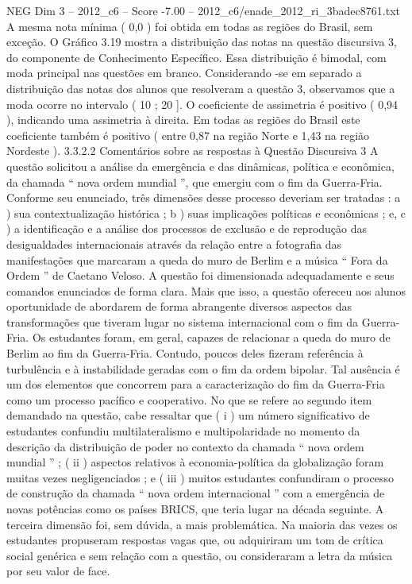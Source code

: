 \begin{textsample}{NEG Dim 3 – 2012\_c6 – Score -7.00 – 2012\_c6/enade\_2012\_ri\_3badec8761.txt}
A mesma nota mínima ( 0,0 ) foi obtida em todas as regiões do Brasil, sem exceção.
O Gráfico 3.19 mostra a distribuição das notas na questão discursiva 3, do componente de Conhecimento Específico.
Essa distribuição é bimodal, com moda principal nas questões em branco.
Considerando -se em separado a distribuição das notas dos alunos que resolveram a questão 3, observamos que a moda ocorre no intervalo ( 10 ; 20 ].
O coeficiente de assimetria é positivo ( 0,94 ), indicando uma assimetria à direita.
Em todas as regiões do Brasil este coeficiente também é positivo ( entre 0,87 na região Norte e 1,43 na região Nordeste ). 3.3.2.2 Comentários sobre as respostas à Questão Discursiva 3 A questão solicitou a análise da emergência e das dinâmicas, política e econômica, da chamada “ nova ordem mundial ”, que emergiu com o fim da Guerra-Fria.
Conforme seu enunciado, três dimensões desse processo deveriam ser tratadas : a ) sua contextualização histórica ; b ) suas implicações políticas e econômicas ; e, c ) a identificação e a análise dos processos de exclusão e de reprodução das desigualdades internacionais através da relação entre a fotografia das manifestações que marcaram a queda do muro de Berlim e a música “ Fora da Ordem ” de Caetano Veloso.
A questão foi dimensionada adequadamente e seus comandos enunciados de forma clara.
Mais que isso, a questão ofereceu aos alunos oportunidade de abordarem de forma abrangente diversos aspectos das transformações que tiveram lugar no sistema internacional com o fim da Guerra-Fria.
Os estudantes foram, em geral, capazes de relacionar a queda do muro de Berlim ao fim da Guerra-Fria.
Contudo, poucos deles fizeram referência à turbulência e à instabilidade geradas com o fim da ordem bipolar.
Tal ausência é um dos elementos que concorrem para a caracterização do fim da Guerra-Fria como um processo pacífico e cooperativo.
No que se refere ao segundo item demandado na questão, cabe ressaltar que ( i ) um número significativo de estudantes confundiu multilateralismo e multipolaridade no momento da descrição da distribuição de poder no contexto da chamada “ nova ordem mundial ” ; ( ii ) aspectos relativos à economia-política da globalização foram muitas vezes negligenciados ; e ( iii ) muitos estudantes confundiram o processo de construção da chamada “ nova ordem internacional ” com a emergência de novas potências como os países BRICS, que teria lugar na década seguinte.
A terceira dimensão foi, sem dúvida, a mais problemática.
Na maioria das vezes os estudantes propuseram respostas vagas que, ou adquiriram um tom de crítica social genérica e sem relação com a questão, ou consideraram a letra da música por seu valor de face.

\end{textsample}
